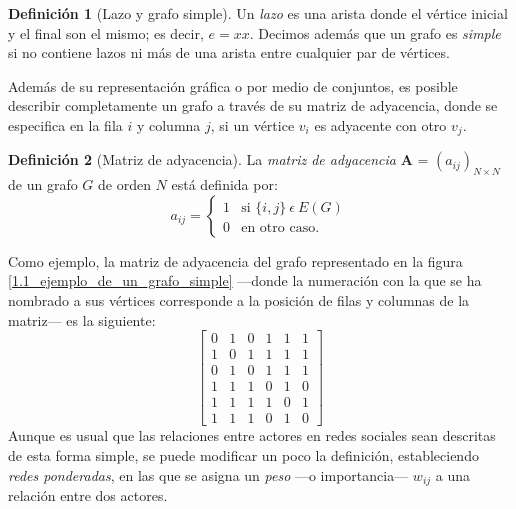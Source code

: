 \documentclass[letterpaper, 11pt]{book}
\theoremstyle{definition}
\newtheorem{definition}{Definición}[chapter]
\theoremstyle{remark}
\begin{document}
\begin{definition}[Lazo y grafo simple]
\label{Lazo_GrafoSimple}
	Un \emph{lazo} es una arista donde el vértice inicial y el final son el mismo; es decir, $e=xx$. Decimos además que un grafo es \emph{simple} si no contiene lazos ni más de una arista entre cualquier par de vértices.
\end{definition}



Además de su representación gráfica o por medio de conjuntos, es posible describir completamente un grafo a través de su matriz de adyacencia, donde se especifica en la fila $i$ y columna $j$, si un vértice $v_{i}$ es adyacente con otro $v_{j}$.

\begin{definition}[Matriz de adyacencia]
\label{MatrizAdyacencia}
	La \emph{matriz de adyacencia} \textbf{A} = $(a_{ij})_{N \times N}$ de un grafo $G$ de orden $N$ está definida por:
	\[ a_{ij} = \left\{ \begin{array}{ll}
	    1 & \text{si } \{i,j\} \ \epsilon \ E(G)\\
	    0 & \text{en otro caso.}\end{array} \right. \]
\end{definition}
Como ejemplo, la matriz de adyacencia del grafo representado en la figura \ref{1.1_ejemplo_de_un_grafo_simple} ---donde la numeración con la que se ha nombrado a sus vértices corresponde a la posición de filas y columnas de la matriz--- es la siguiente:
\[
\begin{bmatrix}
    0 & 1 & 0 & 1 & 1 & 1\\
    1 & 0 & 1 & 1 & 1 & 1\\
    0 & 1 & 0 & 1 & 1 & 1\\
    1 & 1 & 1 & 0 & 1 & 0\\
    1 & 1 & 1 & 1 & 0 & 1\\
    1 & 1 & 1 & 0 & 1 & 0
\end{bmatrix}
\]
Aunque es usual que las relaciones entre actores en redes sociales sean descritas de esta forma simple, se puede modificar un poco la definición, estableciendo \emph{redes ponderadas}, en las que se asigna un \emph{peso} ---o importancia--- $w_{ij}$ a una relación entre dos actores.
\end{document}
